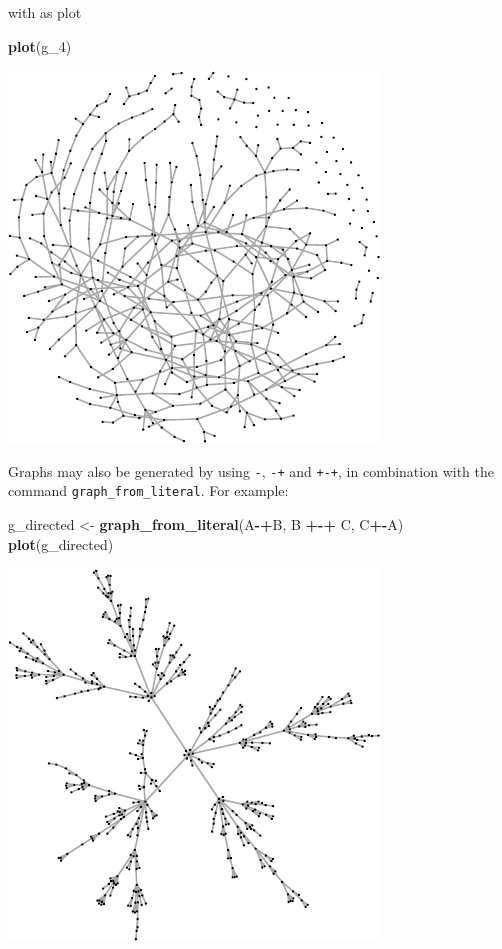 \documentclass[]{article}
\newenvironment{Shaded}{\begin{snugshade}}{\end{snugshade}}
\newcommand{\KeywordTok}[1]{\textcolor[rgb]{0.13,0.29,0.53}{\textbf{#1}}}
\newcommand{\DecValTok}[1]{\textcolor[rgb]{0.00,0.00,0.81}{#1}}
\newcommand{\StringTok}[1]{\textcolor[rgb]{0.31,0.60,0.02}{#1}}
\newcommand{\OperatorTok}[1]{\textcolor[rgb]{0.81,0.36,0.00}{\textbf{#1}}}
\newcommand{\NormalTok}[1]{#1}
\theoremstyle{definition}
\theoremstyle{definition}
\theoremstyle{definition}
\theoremstyle{remark}
\begin{document}
with as plot

\begin{Shaded}
\begin{Highlighting}[]
\KeywordTok{plot}\NormalTok{(g_}\DecValTok{4}\NormalTok{)}
\end{Highlighting}
\end{Shaded}

\includegraphics{ResearchTools_files/figure-latex/unnamed-chunk-55-1.pdf}

Graphs may also be generated by using \texttt{-}, \texttt{-+} and
\texttt{+-+}, in combination with the command
\texttt{graph\_from\_literal}. For example:

\begin{Shaded}
\begin{Highlighting}[]
\NormalTok{g_directed <-}\StringTok{ }\KeywordTok{graph_from_literal}\NormalTok{(A}\OperatorTok{-+}\NormalTok{B, B }\OperatorTok{+-+}\StringTok{ }\NormalTok{C, C}\OperatorTok{+-}\NormalTok{A)}
\KeywordTok{plot}\NormalTok{(g_directed)}
\end{Highlighting}
\end{Shaded}

\includegraphics{ResearchTools_files/figure-latex/unnamed-chunk-56-1.pdf}
\end{document}
